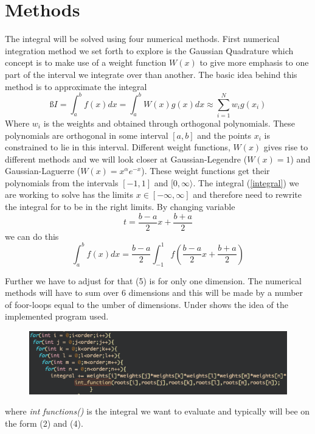 \documentclass[twoside,twocolumn]{article}
\begin{document}
\section{Methods}
The integral will be solved using four numerical methods. First numerical integration method  we set forth to explore is the Gaussian Quadrature which concept is to make use of a weight function $W(x)$ to give more emphasis to one part of the interval we integrate over than another. The basic idea behind this method is to approximate the integral
\begin{equation}ß
   I = \int_{a}^{b}f(x)dx = \int_{a}^{b} W(x)g(x) dx \approx\sum_{i=1}^{N} w_ig(x_i)
\end{equation}
Where $w_i$ is the weights and obtained through orthogonal polynomials. These polynomials are orthogonal in some interval $[a,b]$ and the points $x_i$ is constrained to lie in this interval. Different weight functions, $W(x)$ gives rise to different methods and we will look  closer at Gaussian-Legendre ($W(x) = 1$) and Gaussian-Laguerre ($W(x)  = x^\alpha e^{-x}$). These weight functions get their polynomials from the intervals $[-1,1]$ and $[0,\infty\rangle$. The integral (\ref{integral})
we are working to solve has the limits $x\in[-\infty,\infty]$ and therefore need to rewrite the integral for to be in the right limits. By changing variable
\begin{equation}
		t= \frac{b-a}{2}x + \frac{b+a}{2}
\end{equation}
we can do this
\begin{equation}
		\int_a^b f(x) dx = \frac{b-a}{2} \int_{-1}^1f( \frac{b-a}{2}x + \frac{b+a}{2})
\end{equation}

Further we have to adjust for that (5) is for only one dimension. The numerical methods will have to sum over 6 dimensions and this will be made by a number of foor-loops equal to the umber of dimensions. Under shows the idea of the implemented program used. 

\begin{figure}[h]
\center
\includegraphics[scale=0.4]{foor.png}

\end{figure}
where \textit{int functions()} is the integral we want to evaluate and typically will bee on the form (2) and (4).
\end{document}
